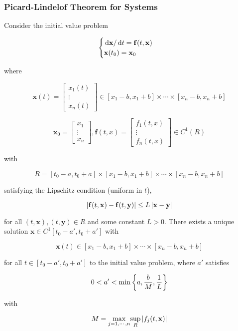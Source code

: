 \documentclass[a4paper,12pt]{article}
\begin{document}
\subsubsection{Picard-Lindelof Theorem for Systems}
\begin{thm}
  Consider the initial value problem

  $$\begin{cases}
    \,\mathrm{d}\mathbf{x}/\,\mathrm{d} t=\mathbf{f}(t,\mathbf{x})\\
    \mathbf{x}(t_{0})=\mathbf{x}_{0}
  \end{cases}$$\s

  where

  $$\mathbf{x}(t)=\begin{bmatrix}
    x_{1}(t)\\
    \vdots\\
    x_{n}(t)
  \end{bmatrix}\in[x_{1}-b,x_{1}+b]\times\cdots\times[x_{n}-b,x_{n}+b]$$\s

  $$\mathbf{x}_{0}=\begin{bmatrix}
    x_{1}\\
    \vdots\\
    x_{n}
  \end{bmatrix},\mathbf{f}(t,x)=\begin{bmatrix}
    f_{1}(t,x)\\
    \vdots\\
    f_{n}(t,x)
  \end{bmatrix}\in C^{1}(R)$$\s

  with

  $$R=[t_{0}-a,t_{0}+a]\times[x_{1}-b,x_{1}+b]\times\cdots\times[x_{n}-b,x_{n}+b]$$\s

  satisfying the Lipschitz condition (uniform in $t$),

  $$\left| \mathbf{f}(t,\mathbf{x})-\mathbf{f}(t,\mathbf{y})\right|\leq L\left| \mathbf{x}-\mathbf{y}\right|$$\s

  for all $(t,\mathbf{x}),(t,\mathbf{y})\in R$ and some constant $L>0$. There exists a unique solution $\mathbf{x}\in C^{1}[t_{0}-a',t_{0}+a']$ with

  $$\mathbf{x}(t)\in[x_{1}-b,x_{1}+b]\times\cdots\times[x_{n}-b,x_{n}+b]$$\s

  for all $t\in[t_{0}-a',t_{0}+a']$ to the initial value problem, where $a'$ satisfies

  $$0<a'<\min\left\{ a,\frac{b}{M},\frac{1}{L}\right\}$$\s

  with

  $$M=\underset{j=1,\cdots,n}{\max}\underset{R}{\sup}\left| f_{j}(t,\mathbf{x})\right|$$
\end{thm}\n
\end{document}
